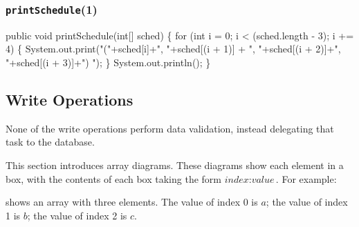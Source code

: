\documentclass{article}
\def\nwendcode{\endtrivlist \endgroup}
\theoremstyle{definition}
\begin{document}
\nwendcode{}\subsubsection{{\tt{}\protect{}printSchedule}(1)}
\nwenddocs{}\endmoddef{}
public void printSchedule(int[] sched) \{
  for (int i = 0; i < (sched.length - 3); i += 4) \{
    System.out.print("("+sched[i]+", "+sched[(i + 1)]
      + ", "+sched[(i + 2)]+", "+sched[(i + 3)]+") ");
  \}
  System.out.println();
\}
\eatline
{}\nwendcode{}\subsection{Write Operations}
\label{sec:write-operations}
None of the write operations perform data validation, instead
delegating that task to the database.

This section introduces array diagrams. These diagrams show each element
in a box, with the contents of each box taking the form
$\textit{index}:\textit{value}$. For example:


\noindent shows an array with three elements. The value of index 0 is $a$; the
value of index 1 is $b$; the value of index 2 is $c$.
\end{document}
